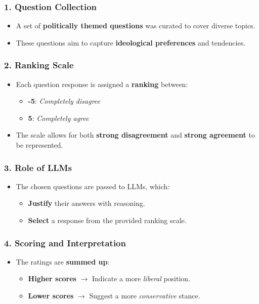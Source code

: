 \documentclass[10pt]{article}
\begin{document}
\subsubsection*{1. Question Collection}
\begin{itemize}
    \item A set of \textbf{politically themed questions} was curated to cover diverse topics.
    \item These questions aim to capture \textbf{ideological preferences} and tendencies.
\end{itemize}

\subsubsection*{2. Ranking Scale}
\begin{itemize}
    \item Each question response is assigned a \textbf{ranking} between:
    \begin{itemize}
        \item \textbf{-5}: \textit{Completely disagree}
        \item \textbf{5}: \textit{Completely agree}
    \end{itemize}
    \item The scale allows for both \textbf{strong disagreement} and \textbf{strong agreement} to be represented.
\end{itemize}

\subsubsection*{3. Role of LLMs}
\begin{itemize}
    \item The chosen questions are passed to LLMs, which:
    \begin{itemize}
        \item \textbf{Justify} their answers with reasoning.
        \item \textbf{Select} a response from the provided ranking scale.
    \end{itemize}
\end{itemize}

\subsubsection*{4. Scoring and Interpretation}
\begin{itemize}
    \item The ratings are \textbf{summed up}:
    \begin{itemize}
        \item \textbf{Higher scores} $\rightarrow$ Indicate a more \textit{liberal} position.
        \item \textbf{Lower scores} $\rightarrow$ Suggest a more \textit{conservative} stance.
    \end{itemize}
\end{itemize}
\end{document}
